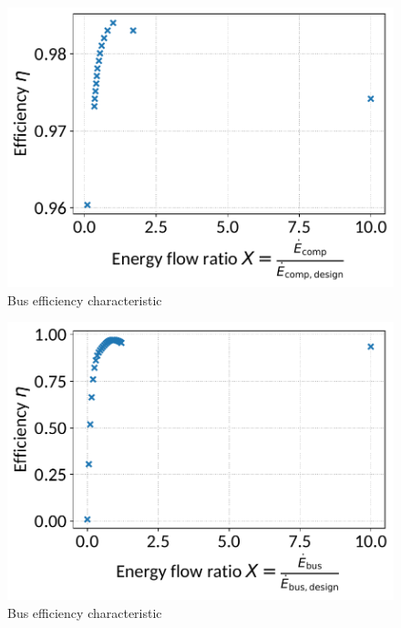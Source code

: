 \begin{minipage}{0.5\textwidth}
\begin{figure}[H]\begin{center}
\includegraphics[width=\textwidth]{figures/Bus_CharLine_gas_turbineoffdesign.pdf}
\caption{Bus efficiency characteristic}
\label{fig:Bus_CharLine_gas turbineoffdesign}
\end{center}\end{figure}

\end{minipage}
\begin{minipage}{0.5\textwidth}
\begin{figure}[H]\begin{center}
\includegraphics[width=\textwidth]{figures/Bus_CharLine_fuel_compressoroffdesign.pdf}
\caption{Bus efficiency characteristic}
\label{fig:Bus_CharLine_fuel compressoroffdesign}
\end{center}\end{figure}

\end{minipage}



